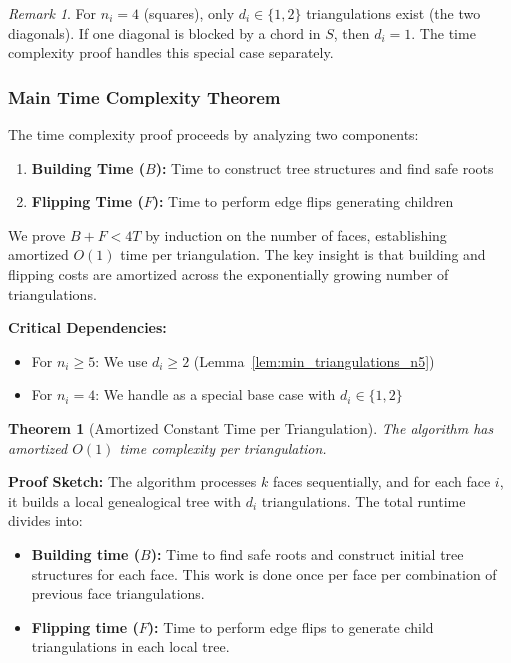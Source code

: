 \documentclass[12pt,a4paper]{article}
\newtheorem{theorem}{Theorem}
\theoremstyle{definition}
\theoremstyle{remark}
\newtheorem{remark}{Remark}
\begin{document}
\begin{remark}
For $n_i = 4$ (squares), only $d_i \in \{1, 2\}$ triangulations exist (the two diagonals). If one diagonal is blocked by a chord in $S$, then $d_i = 1$. The time complexity proof handles this special case separately.
\end{remark}

\subsubsection{Main Time Complexity Theorem}

The time complexity proof proceeds by analyzing two components:
\begin{enumerate}
    \item \textbf{Building Time ($B$):} Time to construct tree structures and find safe roots
    \item \textbf{Flipping Time ($F$):} Time to perform edge flips generating children
\end{enumerate}

We prove $B + F < 4T$ by induction on the number of faces, establishing amortized $O(1)$ time per triangulation. The key insight is that building and flipping costs are amortized across the exponentially growing number of triangulations.

\textbf{Critical Dependencies:}
\begin{itemize}
    \item For $n_i \geq 5$: We use $d_i \geq 2$ (Lemma~\ref{lem:min_triangulations_n5})
    \item For $n_i = 4$: We handle as a special base case with $d_i \in \{1, 2\}$
\end{itemize}

\begin{theorem}[Amortized Constant Time per Triangulation]
\label{thm:time_complexity}
The algorithm has amortized $O(1)$ time complexity per triangulation.
\end{theorem}

\textbf{Proof Sketch:} The algorithm processes $k$ faces sequentially, and for each face $i$, it builds a local genealogical tree with $d_i$ triangulations. The total runtime divides into:
\begin{itemize}
    \item \textbf{Building time ($B$):} Time to find safe roots and construct initial tree structures for each face. This work is done once per face per combination of previous face triangulations.
    \item \textbf{Flipping time ($F$):} Time to perform edge flips to generate child triangulations in each local tree.
\end{itemize}
\end{document}
